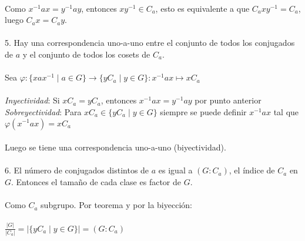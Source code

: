 \documentclass{article}
\begin{document}
\\
Como $x^{-1}ax=y^{-1}ay$, entonces $xy^{-1} \in C_a$, esto es equivalente a que $C_axy^{-1}=C_a$, luego $C_ax=C_ay$.
\\
\\
5. Hay una correspondencia uno-a-uno entre el conjunto de todos los conjugados de $a$ y el conjunto de todos los cosets de $C_a$.
\\
\\
Sea $\varphi: \{xax^{-1} \mid a \in G \} \to \{yC_a \mid y \in G\}: x^{-1}ax \mapsto xC_a$
\\
\\
\textit{Inyectividad}: Si $xC_a=yC_a$, entonces $x^{-1}ax=y^{-1}ay$ por punto anterior
\\
\textit{Sobreyectividad}: Para $xC_a \in \{yC_a \mid y \in G \}$ siempre se puede definir $x^{-1}ax$ tal que $\varphi(x^{-1}ax)=xC_{a}$
\\
\\
Luego se tiene una correspondencia uno-a-uno (biyectividad).
\\
\\
6. El número de conjugados distintos de $a$ es igual a $(G:C_{a})$, el índice de $C_{a}$ en $G$. Entonces el tamaño de cada clase es factor de $G$.
\\
\\
Como $C_a$ subgrupo. Por teorema y por la biyección:
\\
\\
$\frac{|G|}{|C_{a}|}=|\{yC_{a} \mid y \in G \}|=(G:C_{a})$
\end{document}
